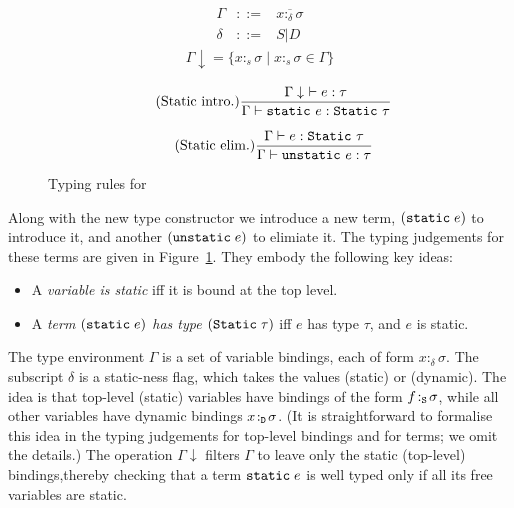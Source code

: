 \documentclass[preprint]{sigplanconf}
\begin{document}
\begin{figure}[t!]
\begin{minipage}{\linewidth}
$$
\begin{array}{rcl}
\Gamma & ::= & \overline{x :_{\delta} \sigma} \\
     \delta & ::= & S | D
\end{array}
$$
\begin{align*}
\Gamma\downarrow = \{ x:_{s} \sigma \mid x :_{s} \sigma \in \Gamma \}
\end{align*}

\begin{equation*}
\tag{Static~intro.}
\frac{\Gamma\downarrow~\vdash e : \tau}
     {\Gamma \vdash \text{\tt static}~e : \text{\tt Static}~\tau}
\end{equation*}

\begin{equation*}
\tag{Static~elim.}
\frac{\Gamma \vdash e : \text{\tt Static}~\tau}
     {\Gamma \vdash \text{\tt unstatic}~e : \tau}
\end{equation*}
\end{minipage}
\caption{Typing rules for } \label{fig:static}
\end{figure}
Along with the new type constructor we introduce a new term,
$(\text{\tt static}\;e)$ to introduce it, and another 
$(\text{\tt unstatic}\;e)$ to elimiate it.
The typing judgements for these terms are given in Figure~\ref{fig:static}.
They embody the following key ideas:
\begin{itemize}
\item A \emph{variable is static} iff it is bound at the top level.
\item A \emph{term $(\text{\tt static}\;e)$ has type $(\text{\tt Static}\;\tau)$} iff 
$e$ has type $\tau$, and $e$ is static.  
\end{itemize}
The type environment $\Gamma$ is a set of variable bindings, each of form $x :_{\delta} \sigma$.
The subscript $\delta$ is a static-ness flag, which takes the values  (static) or
 (dynamic).  The idea is that top-level (static) variables have bindings
of the form $f\! :_{\text{\tt S}}\! \sigma$, while all other variables have dynamic bindings 
$x\! :_{\text{\tt D}}\!\sigma$.
(It is straightforward to formalise this idea in the typing judgements for top-level
bindings and for terms; we omit the details.)
The operation $\Gamma \downarrow$ filters $\Gamma$ to leave only the
static (top-level) bindings,thereby checking that a term $\text{\tt
static}\;e$ is well typed only if all its free variables are static.
\end{document}
